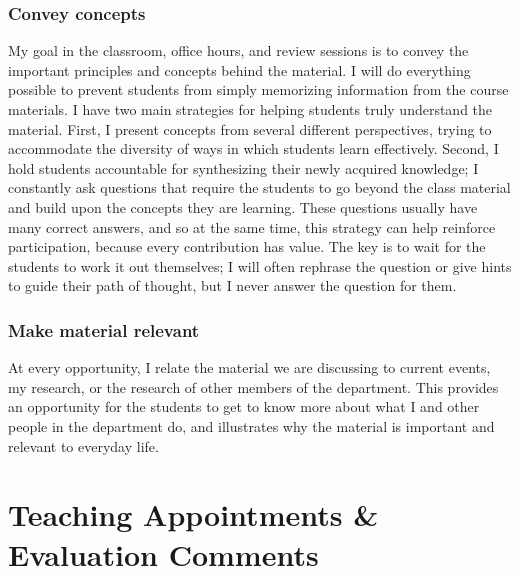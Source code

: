 \documentclass[10pt]{article}
\begin{document}
\subsubsection*{Convey concepts}
My goal in the classroom, office hours, and review sessions is to convey the important principles and concepts behind the material.
I will do everything possible to prevent students from simply memorizing information from the course materials.
I have two main strategies for helping students truly understand the material.
First, I present concepts from several different perspectives, trying to accommodate the diversity of ways in which students learn effectively.
Second, I hold students accountable for synthesizing their newly acquired knowledge; I constantly ask questions that require the students to go beyond the class material and build upon the concepts they are learning.
These questions usually have many correct answers, and so at the same time, this strategy can help reinforce participation, because every contribution has value.
The key is to wait for the students to work it out themselves; I will often rephrase the question or give hints to guide their path of thought, but I never answer the question for them.

\subsubsection*{Make material relevant}
At every opportunity, I relate the material we are discussing to current events, my research, or the research of other members of the department.
This provides an opportunity for the students to get to know more about what I and other people in the department do, and illustrates why the material is important and relevant to everyday life.

\section*{Teaching Appointments \& Evaluation Comments}
\end{document}
